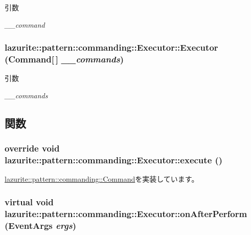 \begin{DoxyParams}{引数}
\item[{\em \_\-\_\-command}]\end{DoxyParams}
\hypertarget{classlazurite_1_1pattern_1_1commanding_1_1_executor_a185d008652f9e183b58fd28b9d6f316a}{
\subsubsection[{Executor}]{\setlength{\rightskip}{0pt plus 5cm}lazurite::pattern::commanding::Executor::Executor ({\bf Command}\mbox{[}$\,$\mbox{]} {\em \_\-\_\-commands})}}
\label{classlazurite_1_1pattern_1_1commanding_1_1_executor_a185d008652f9e183b58fd28b9d6f316a}

\begin{DoxyParams}{引数}
\item[{\em \_\-\_\-commands}]\end{DoxyParams}


\subsection{関数}
\hypertarget{classlazurite_1_1pattern_1_1commanding_1_1_executor_a984262e0d3834f29ac687904b16e1d34}{
\subsubsection[{execute}]{\setlength{\rightskip}{0pt plus 5cm}override void lazurite::pattern::commanding::Executor::execute ()}}
\label{classlazurite_1_1pattern_1_1commanding_1_1_executor_a984262e0d3834f29ac687904b16e1d34}


\hyperlink{classlazurite_1_1pattern_1_1commanding_1_1_command_afd9750cf772a6a65b1a1e11d8313fe03}{lazurite::pattern::commanding::Command}を実装しています。\hypertarget{classlazurite_1_1pattern_1_1commanding_1_1_executor_a1dd58f27ce048634b9fa28c1226c045c}{
\subsubsection[{onAfterPerform}]{\setlength{\rightskip}{0pt plus 5cm}virtual void lazurite::pattern::commanding::Executor::onAfterPerform (EventArgs {\em ergs})}}
\label{classlazurite_1_1pattern_1_1commanding_1_1_executor_a1dd58f27ce048634b9fa28c1226c045c}

